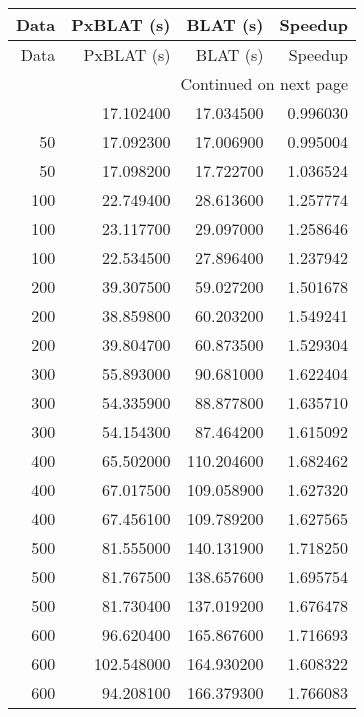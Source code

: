 \begin{longtable}{rrrr}
\toprule
Data & PxBLAT (s) & BLAT (s) & Speedup \\
\midrule
\endfirsthead
\toprule
Data & PxBLAT (s) & BLAT (s) & Speedup \\
\midrule
\endhead
\midrule
\multicolumn{4}{r}{Continued on next page} \\
\midrule
\endfoot
\bottomrule
\endlastfoot
50 & 17.102400 & 17.034500 & 0.996030 \\
50 & 17.092300 & 17.006900 & 0.995004 \\
50 & 17.098200 & 17.722700 & 1.036524 \\
100 & 22.749400 & 28.613600 & 1.257774 \\
100 & 23.117700 & 29.097000 & 1.258646 \\
100 & 22.534500 & 27.896400 & 1.237942 \\
200 & 39.307500 & 59.027200 & 1.501678 \\
200 & 38.859800 & 60.203200 & 1.549241 \\
200 & 39.804700 & 60.873500 & 1.529304 \\
300 & 55.893000 & 90.681000 & 1.622404 \\
300 & 54.335900 & 88.877800 & 1.635710 \\
300 & 54.154300 & 87.464200 & 1.615092 \\
400 & 65.502000 & 110.204600 & 1.682462 \\
400 & 67.017500 & 109.058900 & 1.627320 \\
400 & 67.456100 & 109.789200 & 1.627565 \\
500 & 81.555000 & 140.131900 & 1.718250 \\
500 & 81.767500 & 138.657600 & 1.695754 \\
500 & 81.730400 & 137.019200 & 1.676478 \\
600 & 96.620400 & 165.867600 & 1.716693 \\
600 & 102.548000 & 164.930200 & 1.608322 \\
600 & 94.208100 & 166.379300 & 1.766083 \\
\end{longtable}
